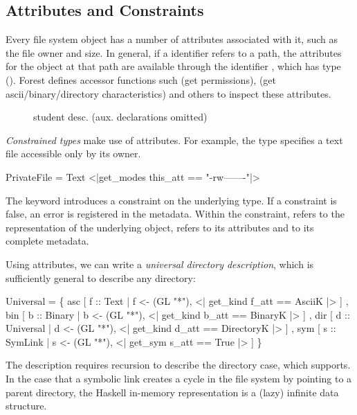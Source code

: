 \subsection{Attributes and Constraints}
\label{sec:constraints}

Every file system object has a number of attributes associated with
it, such as the file owner and size.  In general,
if a \forest{} identifier  refers to a path, the attributes for the object at that
path are available through the identifier , which has
type  ().  Forest defines
accessor functions such  (get permissions),  (get
ascii/binary/directory characteristics) and others to inspect
these attributes.


\begin{figure}

\caption{\forest{} student desc. (aux. declarations omitted)}
\label{fig:student-description}
\end{figure}


\textit{Constrained types} make use of attributes. For example, the
type  specifies a text file accessible only by its owner.
\begin{code}
 PrivateFile = 
 Text  <|get_modes this_att == "-rw-------"|>
\end{code}
The keyword  introduces a constraint on the underlying type.
If a constraint is false, an error 
is registered in the metadata.  Within the constraint,  refers to the representation 
of the underlying object,  refers to its attributes and  
to its complete metadata.

Using attributes, we can write a \textit{universal
  directory description}, which is sufficiently general to describe
any directory:
\begin{code}
 Universal = 
  \{ asc  [ f :: Text 
           | f <-  (GL "*"), 
          <| get_kind f_att == AsciiK |> ]
  , bin  [ b :: Binary 
           | b <-  (GL "*"), 
          <| get_kind b_att == BinaryK |> ]
  , dir  [ d :: Universal  
           | d <-  (GL "*"),
          <| get_kind d_att == DirectoryK |> ]
  , sym  [ s :: SymLink 
           | s <-  (GL "*"), 
          <| get_sym s_att == True |> ]
  \}
\end{code}
The description requires recursion to describe the directory case,
which \forest{} supports.
In the case that a symbolic link creates a cycle in the file system by
pointing to a parent directory, the Haskell in-memory representation
is a (lazy) infinite data structure.  

